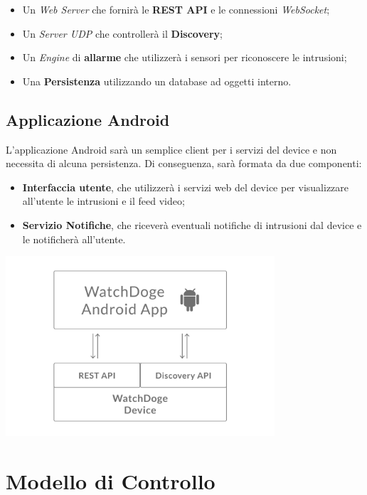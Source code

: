 \documentclass{article}
\begin{document}
\begin{itemize}
    \item Un \textit{Web Server} che fornirà le \textbf{REST API} e le connessioni \textit{WebSocket};
    \item Un \textit{Server UDP} che controllerà il \textbf{Discovery};
    \item Un \textit{Engine} di \textbf{allarme} che utilizzerà i sensori per riconoscere le intrusioni;
    \item Una \textbf{Persistenza} utilizzando un database ad oggetti interno.
\end{itemize}

\subsection{Applicazione Android}

L'applicazione Android sarà un semplice client per i servizi del device e non necessita di alcuna persistenza. Di conseguenza, sarà formata da due componenti:

\begin{itemize}
    \item \textbf{Interfaccia utente}, che utilizzerà i servizi web del device per visualizzare all'utente le intrusioni e il feed video;
    \item \textbf{Servizio Notifiche}, che riceverà eventuali notifiche di intrusioni dal device e le notificherà all'utente.
\end{itemize}

\begin{center}
\includegraphics[width=10cm]{schema-android.pdf}
\end{center}

\section{Modello di Controllo}
\end{document}
